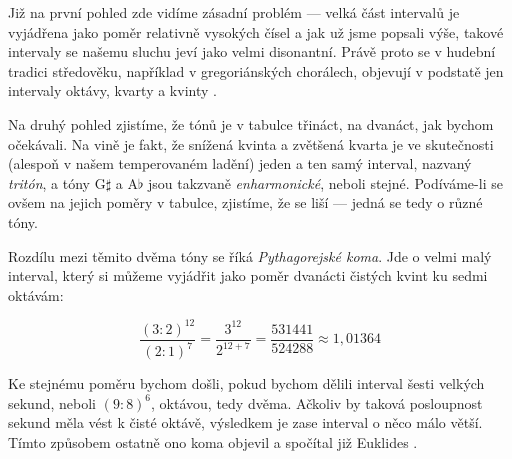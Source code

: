 \documentclass[12pt]{article}
\begin{document}
Již na první pohled zde vidíme zásadní problém — velká část intervalů je vyjádřena jako poměr relativně vysokých čísel a jak už jsme popsali výše, takové intervaly se našemu sluchu jeví jako velmi disonantní. Právě proto se v hudební tradici středověku, například v gregoriánských chorálech, objevují v podstatě jen intervaly oktávy, kvarty a kvinty \cite{smolka}.

Na druhý pohled zjistíme, že tónů je v tabulce třináct, na dvanáct, jak bychom očekávali. Na vině je fakt, že snížená kvinta a zvětšená kvarta je ve skutečnosti (alespoň v našem temperovaném ladění) jeden a ten samý interval, nazvaný \emph{tritón}, a tóny G$\sharp$ a A$\flat$ jsou takzvaně \emph{enharmonické}, neboli stejné. Podíváme-li se ovšem na jejich poměry v tabulce, zjistíme, že se liší — jedná se tedy o různé tóny.

Rozdílu mezi těmito dvěma tóny se říká \emph{Pythagorejské koma}. Jde o velmi malý interval, který si můžeme vyjádřit jako poměr dvanácti čistých kvint ku sedmi oktávám:

\begin{equation}
\dfrac{\left(3 : 2\right)^{12}}{\left(2 : 1\right)^7} = \dfrac{3^{12}}{2^{12 + 7}} = \dfrac{531441}{524288} \approx 1,01364
\end{equation}

Ke stejnému poměru bychom došli, pokud bychom dělili interval šesti velkých sekund, neboli $(9 : 8)^6$, oktávou, tedy dvěma. Ačkoliv by taková posloupnost sekund měla vést k čisté oktávě, výsledkem je zase interval o něco málo větší. Tímto způsobem ostatně ono koma objevil a spočítal již Euklides \cite{barker}.
\end{document}

